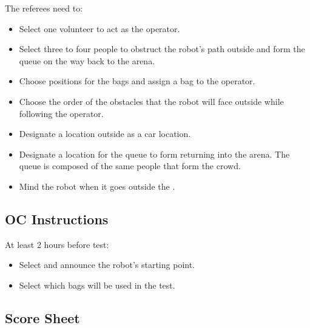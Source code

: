 The referees need to:
\begin{itemize}[nosep]
	\item Select one volunteer to act as the operator.
	\item Select three to four people to obstruct the robot's path outside and form the queue on the way back to the arena.
	\item Choose positions for the bags and assign a bag to the operator.
	\item Choose the order of the obstacles that the robot will face outside while following the operator.
	\item Designate a location outside as a car location.
	\item Designate a location for the queue to form returning into the arena. The queue is composed of the same people that form the crowd.
	\item Mind the robot when it goes outside the \Arena{}.
\end{itemize}

\subsection*{OC Instructions}

At least 2 hours before test:
\begin{itemize}[nosep]
	\item Select and announce the robot's starting point.
	\item Select which bags will be used in the test.
\end{itemize}

\subsection*{Score Sheet}

